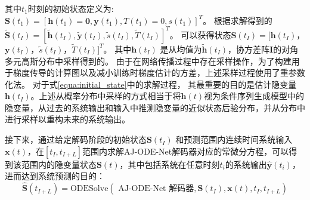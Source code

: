 其中$t_1$时刻的初始状态定义为:
$
\boldsymbol S(t_1)=\left[\boldsymbol h(t_1) = \boldsymbol 0,\boldsymbol y(t_1),T(t_1)=0,s(t_1)\right ]^T
$。 
根据求解得到的
$\boldsymbol{\tilde{S}}(t_I)=[\boldsymbol{\tilde h}(t_I), \boldsymbol{\tilde y}(t_I), \tilde s(t_I), \tilde T(t_I)]^T$。
可以获得状态$\boldsymbol{S}(t_I)=[\boldsymbol{h}(t_I)$，$ \boldsymbol{y}(t_I)$，$ \tilde s(t_I)$，$ \tilde T(t_I)]^T$。
其中$\boldsymbol{h}(t_I)$ 是从均值为$\boldsymbol{\tilde h}(t_I)$，协方差阵$\boldsymbol I$的对角多元高斯分布中采样得到的。
由于在网络传播过程中存在采样操作，为了构建用于梯度传导的计算图以及减小训练时梯度估计的方差，上述采样过程使用了重参数化法\cite{kingma2013auto}。
对于式\ref{equa:initial_state}中的求解过程，
其最重要的目的是估计隐变量$\boldsymbol h(t_I)$。上述从概率分布中采样的方式相当于将$\boldsymbol h(t)$视为条件序列生成模型中的隐变量，从过去的系统输出和输入中推测隐变量的近似状态后验分布，并从分布中进行采样以重构未来的系统输出\cite{10.5555/3454287.3454765,Hafner2019}。

接下来，通过给定解码阶段的初始状态$\boldsymbol S(t_I)$ 和预测范围内连续时间系统输入$\boldsymbol x(t)$，在$[t_I, t_{I+L}]$范围内求解AJ-ODE-Net解码器对应的常微分方程，可以得到该范围内的隐变量状态$\boldsymbol S(t)$，其中包括系统在任意时刻$t_i$的系统输出$\boldsymbol{\hat{y}}(t_i)$，进而达到系统预测的目的：
\begin{equation}
\boldsymbol {\hat S}(t_{I+L})=\text{ODESolve}(\text{ AJ-ODE-Net 解码器},\boldsymbol S(t_I)
, \boldsymbol {x}(t), t_I, t_{I+L})
\label{equ:decoding}
\end{equation}



